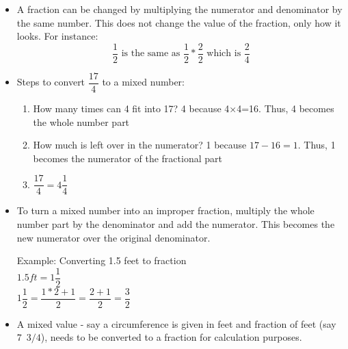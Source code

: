 \begin{itemize}
\item A fraction can be changed by multiplying the numerator and denominator by the same number. This does not change the value of the fraction, only how it looks. For instance:
$$
\dfrac{1}{2} \text { is the same as } \dfrac{1}{2} * \dfrac{2}{2} \text { which is } \dfrac{2}{4}
$$

\item Steps to convert $\dfrac{17}{4}$ to a mixed number:
\begin{enumerate}[Step 1.]
\item How many times can 4 fit into 17? 4 because 4×4=16.  Thus, 4 becomes the whole number part
\item How much is left over in the numerator? 1 because $17-16=1$.  Thus, 1 becomes the numerator of the fractional part
\item $\dfrac{17}{4} = 4\dfrac{1}{4}$
\end{enumerate}
\vspace{0.2cm}
\item To turn a mixed number into an improper fraction, multiply the whole number part by the denominator and add the numerator. This becomes the new numerator over the original denominator.

Example: Converting 1.5 feet to fraction\\
$1.5ft=1\dfrac{1}{2}$\\
\vspace{0.2cm}
$1\dfrac{1}{2}=\dfrac{1*2+1}{2}=\dfrac{2+1}{2}=\dfrac{3}{2}$
\vspace{0.2cm}
\item A mixed value - say a circumference is given in feet and fraction of feet (say $7 \enspace 3/4$), needs to be converted to a fraction for calculation purposes.
\end{itemize}



